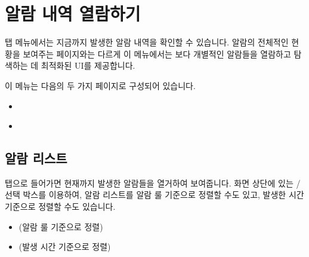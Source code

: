 \documentclass[letterpaper,10pt,english]{sphinxmanual}
\begin{document}
\chapter{알람 내역 열람하기}
\label{\detokenize{part05/index:id1}}\label{\detokenize{part05/index::doc}}
 탭 메뉴에서는 지금까지 발생한 알람 내역을 확인할 수 있습니다. 알람의 전체적인 현황을 보여주는 {\hyperref[\detokenize{part03/index:statistics}]{}} 페이지와는 다르게 이 메뉴에서는 보다 개별적인 알람들을 열람하고 탐색하는 데 최적화된 UI를 제공합니다.

이 메뉴는 다음의 두 가지 페이지로 구성되어 있습니다.
\begin{itemize}
\item {} 
{\hyperref[\detokenize{part05/index:alarm-list}]{}}

\item {} 
{\hyperref[\detokenize{part05/index:alarm-details}]{}}

\end{itemize}


\section{알람 리스트}
\label{\detokenize{part05/index:alarm-list}}\label{\detokenize{part05/index:id2}}
 탭으로 들어가면 현재까지 발생한 알람들을 열거하여 보여줍니다. 화면 상단에 있는  /  선택 박스를 이용하여, 알람 리스트를 알람 룰 기준으로 정렬할 수도 있고, 발생한 시간 기준으로 정렬할 수도 있습니다.
\begin{itemize}
\item {} 
 (알람 룰 기준으로 정렬)
\begin{quote}

\begin{figure}[H]
\centering

\noindent{}
\end{figure}
\end{quote}

\item {} 
 (발생 시간 기준으로 정렬)
\begin{quote}

\begin{figure}[H]
\centering

\noindent{}
\end{figure}
\end{quote}

\end{itemize}
\end{document}
